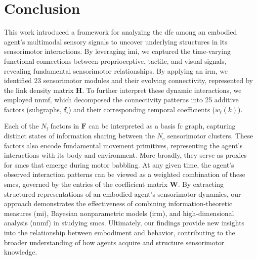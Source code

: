 \section{Conclusion}
This work introduced a framework for analyzing the \acl{dfc} among an embodied agent's multimodal sensory signals to uncover underlying structures in its sensorimotor interactions. By leveraging \acl{imi}, we captured the time-varying functional connections between proprioceptive, tactile, and visual signals, revealing fundamental sensorimotor relationships. By applying an \acl{irm}, we identified 23 sensorimotor modules and their evolving connectivity, represented by the link density matrix $\bm{H}$. To further interpret these dynamic interactions, we employed \acl{nnmf}, which decomposed the connectivity patterns into 25 additive factors (subgraphs, $\bm{f}_i$) and their corresponding temporal coefficients ($w_i(k)$).

Each of the $N_\text{f}$ factors in $\bm{F}$ can be interpreted as a basis \ac{fc} graph, capturing distinct states of information sharing between the $N_\text{c}$ sensorimotor clusters. These factors also encode fundamental movement primitives, representing the agent’s interactions with its body and environment. More broadly, they serve as proxies for \acp{smc} that emerge during motor babbling. At any given time, the agent’s observed interaction patterns can be viewed as a weighted combination of these \acp{smc}, governed by the entries of the coefficient matrix $\bm{W}$. By extracting structured representations of an embodied agent’s sensorimotor dynamics, our approach demonstrates the effectiveness of combining information-theoretic measures (\acl{mi}), Bayesian nonparametric models (\acl{irm}), and high-dimensional analysis (\ac{nnmf}) in studying \acp{smc}. Ultimately, our findings provide new insights into the relationship between embodiment and behavior, contributing to the broader understanding of how agents acquire and structure sensorimotor knowledge.

